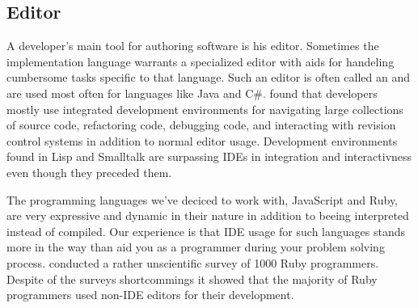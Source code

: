 \subsection{Editor}

A developer's main tool for authoring software is his editor. Sometimes the
implementation language warrants a specialized editor with aids for
handeling cumbersome tasks specific to that language. Such an editor is often
called an %
and are used most often for languages like Java and C\#.
\citet{murphy06} found that developers mostly use integrated
development environments for navigating large
collections of source code, refactoring code, debugging code, and interacting
with revision control systems in addition to normal editor usage.
Development environments found in Lisp%
and Smalltalk%
are surpassing IDEs in integration and interactivness even though they
preceded them.

The programming languages we've deciced to work with, JavaScript and Ruby, are
very expressive and dynamic in their nature in addition to beeing interpreted
instead of compiled. Our experience is that IDE usage for such languages
stands more in the way than aid you as a programmer during your problem
solving process.
\citet{bray07} conducted a rather unscientific survey of 1000 Ruby
programmers. Despite of the surveys shortcommings it showed that
the majority of Ruby programmers used non-IDE editors for their
development.

